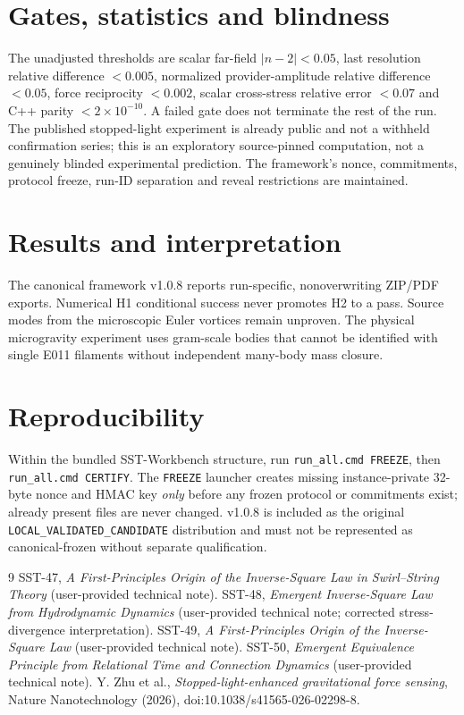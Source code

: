 \documentclass[10pt,a4paper]{article}
\begin{document}
\section{Gates, statistics and blindness}
The unadjusted thresholds are scalar far-field $|n-2|<0.05$, last resolution relative difference $<0.005$, normalized provider-amplitude relative difference $<0.05$, force reciprocity $<0.002$, scalar cross-stress relative error $<0.07$ and C++ parity $<2\times10^{-10}$. A failed gate does not terminate the rest of the run. The published stopped-light experiment is already public and not a withheld confirmation series; this is an exploratory source-pinned computation, not a genuinely blinded experimental prediction. The framework's nonce, commitments, protocol freeze, run-ID separation and reveal restrictions are maintained.
\section{Results and interpretation}
The canonical framework v1.0.8 reports run-specific, nonoverwriting ZIP/PDF exports. Numerical H1 conditional success never promotes H2 to a pass. Source modes from the microscopic Euler vortices remain unproven. The physical microgravity experiment uses gram-scale bodies that cannot be identified with single E011 filaments without independent many-body mass closure.
\section{Reproducibility}
Within the bundled SST-Workbench structure, run \texttt{run\_all.cmd FREEZE}, then \texttt{run\_all.cmd CERTIFY}. The \texttt{FREEZE} launcher creates missing instance-private 32-byte nonce and HMAC key \emph{only} before any frozen protocol or commitments exist; already present files are never changed. v1.0.8 is included as the original \texttt{LOCAL\_VALIDATED\_CANDIDATE} distribution and must not be represented as canonical-frozen without separate qualification.
\begin{thebibliography}{9}
SST-47, \emph{A First-Principles Origin of the Inverse-Square Law in Swirl--String Theory} (user-provided technical note).
SST-48, \emph{Emergent Inverse-Square Law from Hydrodynamic Dynamics} (user-provided technical note; corrected stress-divergence interpretation).
SST-49, \emph{A First-Principles Origin of the Inverse-Square Law} (user-provided technical note).
SST-50, \emph{Emergent Equivalence Principle from Relational Time and Connection Dynamics} (user-provided technical note).
Y. Zhu et al., \emph{Stopped-light-enhanced gravitational force sensing}, Nature Nanotechnology (2026), doi:10.1038/s41565-026-02298-8.
\end{thebibliography}
\end{document}
